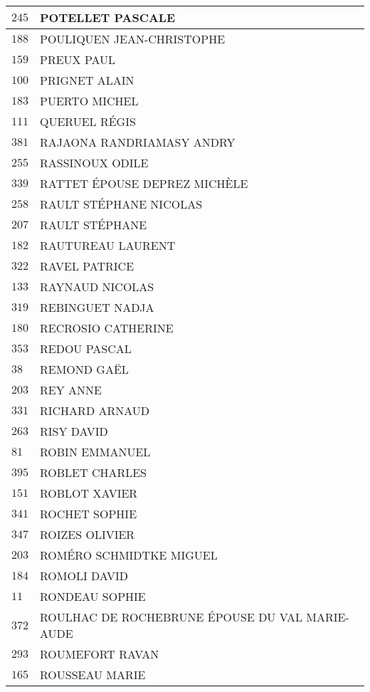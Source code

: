\begin{xltabular}{\linewidth}{|l|X|}
    \hline
    $245$ & POTELLET PASCALE \\
    \hline
    $188$ & POULIQUEN JEAN-CHRISTOPHE \\
    \hline
    $159$ & PREUX PAUL \\
    \hline
    $100$ & PRIGNET ALAIN \\
    \hline
    $183$ & PUERTO MICHEL \\
    \hline
    $111$ & QUERUEL RÉGIS \\
    \hline
    $381$ & RAJAONA RANDRIAMASY ANDRY \\
    \hline
    $255$ & RASSINOUX ODILE \\
    \hline
    $339$ & RATTET ÉPOUSE DEPREZ MICHÈLE \\
    \hline
    $258$ & RAULT STÉPHANE NICOLAS \\
    \hline
    $207$ & RAULT STÉPHANE \\
    \hline
    $182$ & RAUTUREAU LAURENT \\
    \hline
    $322$ & RAVEL PATRICE \\
    \hline
    $133$ & RAYNAUD NICOLAS \\
    \hline
    $319$ & REBINGUET NADJA \\
    \hline
    $180$ & RECROSIO CATHERINE \\
    \hline
    $353$ & REDOU PASCAL \\
    \hline
    $38$ & REMOND GAËL \\
    \hline
    $203$ & REY ANNE \\
    \hline
    $331$ & RICHARD ARNAUD \\
    \hline
    $263$ & RISY DAVID \\
    \hline
    $81$ & ROBIN EMMANUEL \\
    \hline
    $395$ & ROBLET CHARLES \\
    \hline
    $151$ & ROBLOT XAVIER \\
    \hline
    $341$ & ROCHET SOPHIE \\
    \hline
    $347$ & ROIZES OLIVIER \\
    \hline
    $203$ & ROMÉRO SCHMIDTKE MIGUEL \\
    \hline
    $184$ & ROMOLI DAVID \\
    \hline
    $11$ & RONDEAU SOPHIE \\
    \hline
    $372$ & ROULHAC DE ROCHEBRUNE ÉPOUSE DU VAL MARIE-AUDE \\
    \hline
    $293$ & ROUMEFORT RAVAN \\
    \hline
    $165$ & ROUSSEAU MARIE \\

\end{xltabular}
